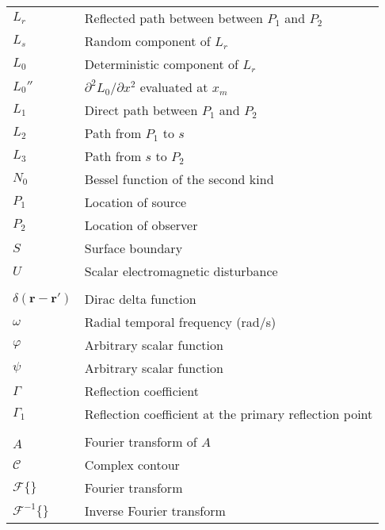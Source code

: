 \begin{supertabular}{ll}
$L_r$ & Reflected path between between $P_1$ and $P_2$\\
$L_s$ & Random component of $L_r$\\
$L_0$ & Deterministic component of $L_r$\\
$L_0''$ & $\partial^2 L_0 /\partial x^2$ evaluated at $x_m$\\
$L_1$ & Direct path between $P_1$ and $P_2$\\
$L_2$ & Path from $P_1$ to $s$\\
$L_3$ & Path from $s$ to $P_2$\\
$N_0$ & Bessel function of the second kind \\
$P_1$ & Location of source\\
$P_2$ & Location of observer\\
$S$ & Surface boundary \\
$U$ & Scalar electromagnetic disturbance\\
\\
$\delta\left(\mathbf{r}-\mathbf{r}' \right)$ & Dirac delta function \\
$\omega$ & Radial temporal frequency (rad/s)\\
$\varphi$ & Arbitrary scalar function\\
$\psi$ & Arbitrary scalar function\\
$\Gamma$ & Reflection coefficient\\
$\Gamma_1$ & Reflection coefficient at the primary reflection point\\
\\
$\hat{A}$ & Fourier transform of $A$ \\
$\mathcal{C}$ & Complex contour \\
$\mathcal{F}\{\}$ & Fourier transform \\
$\mathcal{F}^{-1}\{\}$ & Inverse Fourier transform \\
\end{supertabular}
